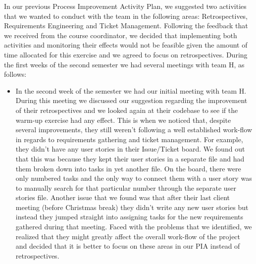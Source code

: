\documentclass[11pt]{article}
\begin{document}
\par
    In our previous Process Improvement Activity Plan, we suggested two activities that we wanted to conduct with the team in the following areas: Retrospectives, Requirements Engineering and Ticket Management. Following the feedback that we received from the course coordinator, we decided that implementing both activities and monitoring their effects would not be feasible given the amount of time allocated for this exercise and we agreed to focus on retrospectives. During the first weeks of the second semester we had several meetings with team H, as follows:

\begin{itemize}
\item In the second week of the semester we had our initial meeting with team H. During this meeting we discussed our suggestion regarding the improvement of their retrospectives and we looked again at their codebase to see if the warm-up exercise had any effect. This is when we noticed that, despite several improvements, they still weren't following a well established work-flow in regards to requirements gathering and ticket management. For example, they didn't have any user stories in their Issue/Ticket board. We found out that this was because they kept their user stories in a separate file and had them broken down into tasks in yet another file. On the board, there were only numbered tasks and the only way to connect them with a user story was to manually search for that particular number through the separate user stories file. Another issue that we found was that after their last client meeting (before Christmas break) they didn't write any new user stories but instead they jumped straight into assigning tasks for the new requirements gathered during that meeting. Faced with the problems that we identified, we realized that they might greatly affect the overall work-flow of the project and decided that it is better to focus on these areas in our PIA instead of retrospectives.


\end{itemize}
\end{document}
